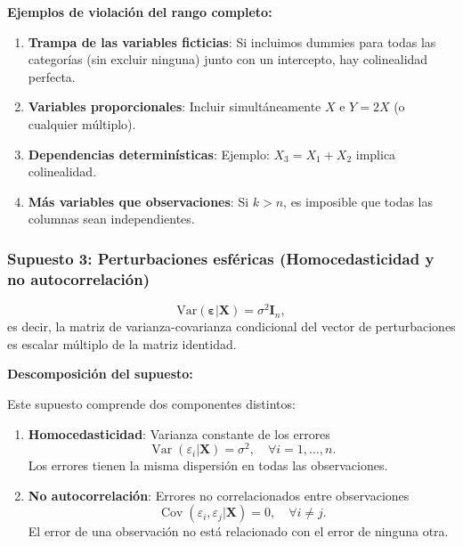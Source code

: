 \documentclass[11pt,a4paper]{article}
\DeclareMathOperator{\Var}{Var}
\DeclareMathOperator{\Cov}{Cov}
\begin{document}
\noindent\textbf{Ejemplos de violación del rango completo:}

\begin{enumerate}
\item \textbf{Trampa de las variables ficticias}: Si incluimos dummies para todas las categorías (sin excluir ninguna) junto con un intercepto, hay colinealidad perfecta.

\item \textbf{Variables proporcionales}: Incluir simultáneamente \(X\) e \(Y=2X\) (o cualquier múltiplo).

\item \textbf{Dependencias determinísticas}: Ejemplo: \(X_3 = X_1 + X_2\) implica colinealidad.

\item \textbf{Más variables que observaciones}: Si \(k > n\), es imposible que todas las columnas sean independientes.
\end{enumerate}

\subsubsection{Supuesto 3: Perturbaciones esféricas (Homocedasticidad y no autocorrelación)}

\begin{tcolorbox}[colback=white, colframe=orange!60, colbacktitle=orange!70, coltitle=white, title=Supuesto 3: Perturbaciones Esféricas, fonttitle=\bfseries]
\[
\boxed{\mathrm{Var}(\boldsymbol{\varepsilon}|\mathbf{X}) = \sigma^2 \mathbf{I}_n},
\]
es decir, la matriz de varianza-covarianza condicional del vector de perturbaciones es escalar múltiplo de la matriz identidad.
\end{tcolorbox}

\noindent\textbf{Descomposición del supuesto:}

Este supuesto comprende dos componentes distintos:

\begin{enumerate}
\item \textbf{Homocedasticidad}: Varianza constante de los errores
\[
\Var(\varepsilon_i|\mathbf{X}) = \sigma^2, \quad \forall i = 1, \dots, n.
\]
Los errores tienen la misma dispersión en todas las observaciones.

\item \textbf{No autocorrelación}: Errores no correlacionados entre observaciones
\[
\Cov(\varepsilon_i, \varepsilon_j|\mathbf{X}) = 0, \quad \forall i \neq j.
\]
El error de una observación no está relacionado con el error de ninguna otra.
\end{enumerate}
\end{document}
